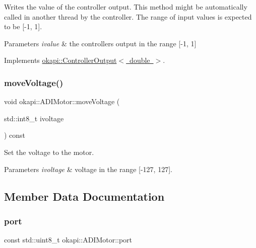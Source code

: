 Writes the value of the controller output. This method might be automatically called in another thread by the controller. The range of input values is expected to be \mbox{[}-\/1, 1\mbox{]}.


\begin{DoxyParams}{Parameters}
{\em ivalue} & the controller\textquotesingle{}s output in the range \mbox{[}-\/1, 1\mbox{]} \\
\hline
\end{DoxyParams}


Implements \mbox{\hyperlink{classokapi_1_1ControllerOutput_a360c08f0c10b36f882d6d3100c2cad49}{okapi\+::\+Controller\+Output$<$ double $>$}}.

\mbox{\label{classokapi_1_1ADIMotor_a4c992efbe21467c0339308fba926b1a6}} 
\subsubsection{\texorpdfstring{moveVoltage()}{moveVoltage()}}
{\footnotesize\ttfamily void okapi\+::\+A\+D\+I\+Motor\+::move\+Voltage (\begin{DoxyParamCaption}\item[{std\+::int8\+\_\+t}]{ivoltage }\end{DoxyParamCaption}) const\hspace{0.3cm}{\ttfamily [virtual]}}

Set the voltage to the motor.


\begin{DoxyParams}{Parameters}
{\em ivoltage} & voltage in the range \mbox{[}-\/127, 127\mbox{]}. \\
\hline
\end{DoxyParams}


\subsection{Member Data Documentation}
\mbox{\label{classokapi_1_1ADIMotor_aae748af2c07c58821db34dff7924f4b7}} 
\subsubsection{\texorpdfstring{port}{port}}
{\footnotesize\ttfamily const std\+::uint8\+\_\+t okapi\+::\+A\+D\+I\+Motor\+::port\hspace{0.3cm}{\ttfamily [protected]}}

